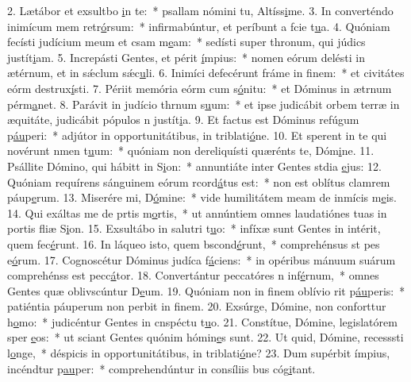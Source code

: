 2. Lætábor et exsultbo \uline{i}n te:~* psallam nómini tu, Altíss\uline{i}me.
3. In converténdo inimícum mem retr\uline{ó}rsum:~* infirmabúntur, et períbunt a fcie t\uline{u}a.
4. Quóniam fecísti judícium meum et csam m\uline{e}am:~* sedísti super thronum, qui júdics justít\uline{i}am.
5. Increpásti Gentes, et périt \uline{í}mpius:~* nomen eórum delésti in ætérnum, et in sǽclum sǽc\uline{u}li.
6. Inimíci defecérunt fráme in f\uline{i}nem:~* et civitátes eórm destrux\uline{í}sti.
7. Périit memória eórm cum s\uline{ó}nitu:~* et Dóminus in ætrnum pérm\uline{a}net.
8. Parávit in judício thrnum s\uline{u}um:~* et ipse judicábit orbem terræ in æquitáte, judicábit pópulos n justít\uline{i}a.
9. Et factus est Dóminus refúgum p\uline{áu}peri:~* adjútor in opportunitátibus, in triblati\uline{ó}ne.
10. Et sperent in te qui novérunt nmen t\uline{u}um:~* quóniam non dereliquísti quærénts te, Dóm\uline{i}ne.
11. Psállite Dómino, qui hábitt in S\uline{i}on:~* annuntiáte inter Gentes stdia \uline{e}jus:
12. Quóniam requírens sánguinem eórum rcord\uline{á}tus est:~* non est oblítus clamrem páup\uline{e}rum.
13. Miserére mi, D\uline{ó}mine:~* vide humilitátem meam de inmícis m\uline{e}is.
14. Qui exáltas me de prtis m\uline{o}rtis,~* ut annúntiem omnes laudatiónes tuas in portis fliæ S\uline{i}on.
15. Exsultábo in salutri t\uline{u}o:~* infíxæ sunt Gentes in intérit, quem fec\uline{é}runt.
16. In láqueo isto, quem bscond\uline{é}runt,~* comprehénsus st pes e\uline{ó}rum.
17. Cognoscétur Dóminus judíca f\uline{á}ciens:~* in opéribus mánuum suárum comprehénss est pecc\uline{á}tor.
18. Convertántur peccatóres n inf\uline{é}rnum,~* omnes Gentes quæ oblivscúntur D\uline{e}um.
19. Quóniam non in finem oblívio rit p\uline{áu}peris:~* patiéntia páuperum non perbit in f\uline{i}nem.
20. Exsúrge, Dómine, non conforttur h\uline{o}mo:~* judicéntur Gentes in cnspéctu t\uline{u}o.
21. Constítue, Dómine, legislatórem sper \uline{e}os:~* ut sciant Gentes quónim hómin\uline{e}s sunt.
22. Ut quid, Dómine, recesssti l\uline{o}nge,~* déspicis in opportunitátibus, in triblati\uline{ó}ne?
23. Dum supérbit ímpius, incéndtur p\uline{au}per:~* comprehendúntur in consíliis bus cóg\uline{i}tant.
